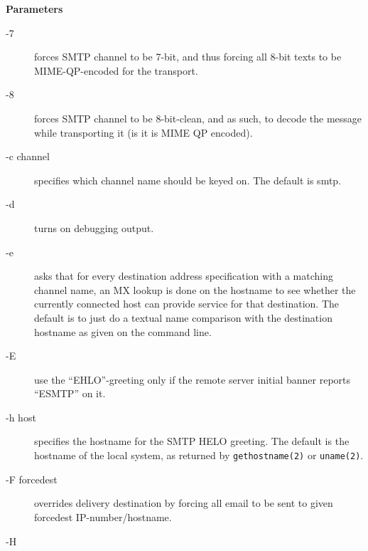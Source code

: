 {\bf Parameters}

\begin{description}
\item[-7] \mbox{}

forces SMTP channel to be 7-bit, and thus forcing
all 8-bit texts to be MIME-QP-encoded for the transport.



\item[-8] \mbox{}

forces SMTP channel to be 8-bit-clean, and as such,
to decode the message while transporting it (is it
is MIME QP encoded).



\item[-c channel] \mbox{}

specifies which channel name should be keyed on.
The default is smtp.



\item[-d] \mbox{}

turns on debugging output.



\item[-e] \mbox{}

asks that for every destination address specification 
with a matching channel name, an MX lookup is
done on the hostname to see whether the currently
connected host can provide service for that destination. 
The default is to just do a textual name
comparison with the destination hostname as given
on the command line.



\item[-E] \mbox{}

use the ``EHLO''-greeting only if the remote server
initial banner reports ``ESMTP'' on it.



\item[-h host] \mbox{}

specifies the hostname for the SMTP HELO greeting.
The default is the hostname of the local system, as
returned by {\tt gethostname(2)} or {\tt uname(2)}.



\item[-F forcedest] \mbox{}

overrides delivery destination by forcing all
email to be sent to given forcedest IP-number/hostname.



\item[-H] \mbox{}


\end{description}
